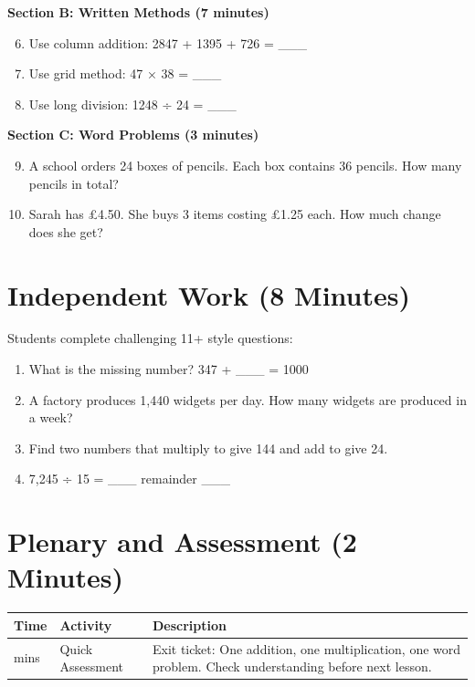 \documentclass{article}
\begin{document}
\textbf{Section B: Written Methods (7 minutes)}
\begin{enumerate}
    \setcounter{enumi}{5}
    \item Use column addition: 2847 + 1395 + 726 = \_\_\_
    \item Use grid method: 47 × 38 = \_\_\_
    \item Use long division: 1248 ÷ 24 = \_\_\_
\end{enumerate}

\textbf{Section C: Word Problems (3 minutes)}
\begin{enumerate}
    \setcounter{enumi}{8}
    \item A school orders 24 boxes of pencils. Each box contains 36 pencils. How many pencils in total?
    \item Sarah has £4.50. She buys 3 items costing £1.25 each. How much change does she get?
\end{enumerate}

\section{Independent Work (8 Minutes)}

Students complete challenging 11+ style questions:
\begin{enumerate}
    \item What is the missing number? 347 + \_\_\_ = 1000
    \item A factory produces 1,440 widgets per day. How many widgets are produced in a week?
    \item Find two numbers that multiply to give 144 and add to give 24.
    \item 7,245 ÷ 15 = \_\_\_ remainder \_\_\_
\end{enumerate}

\section{Plenary and Assessment (2 Minutes)}

\begin{tabularx}{\textwidth}{|>{\raggedright\arraybackslash}p{1cm}|>{\raggedright\arraybackslash}p{3cm}|>{\raggedright\arraybackslash}X|}
\hline
\textbf{Time} & \textbf{Activity} & \textbf{Description} \\
\hline
2 mins & Quick Assessment & Exit ticket: One addition, one multiplication, one word problem. Check understanding before next lesson. \\
\hline
\end{tabularx}
\end{document}
